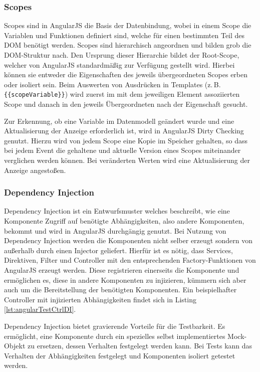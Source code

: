 \subsubsection{Scopes}
\label{sec:scopes}
Scopes sind in AngularJS die Basis der Datenbindung, wobei in einem Scope die Variablen und Funktionen definiert sind, welche für einen bestimmten Teil des DOM benötigt werden. Scopes sind hierarchisch angeordnen und bilden grob die DOM-Struktur nach. Den Ursprung dieser Hierarchie bildet der Root-Scope, welcher von AngularJS standardmäßig zur Verfügung gestellt wird. Hierbei können sie entweder die Eigenschaften des jeweils übergeordneten Scopes erben oder isoliert sein. Beim Auswerten von Ausdrücken in Templates (z.\,B. \texttt{\{\{scopeVariable\}\}}) wird zuerst im mit dem jeweiligen Element assoziierten Scope und danach in den jeweils Übergeordneten nach der Eigenschaft gesucht.\cites[23\psqq]{angular-boehm}[]{angular-scopes}

Zur Erkennung, ob eine Variable im Datenmodell geändert wurde und eine Aktualisierung der Anzeige erforderlich ist, wird in AngularJS Dirty Checking genutzt. Hierzu wird von jedem Scope eine Kopie im Speicher gehalten, so dass bei jedem Event die gehaltene und aktuelle Version eines Scopes miteinander verglichen werden können. Bei veränderten Werten wird eine Aktualisierung der Anzeige angestoßen.\cites[24]{angular-boehm}[]{angular-dirty}

\subsubsection{Dependency Injection}
Dependency Injection ist ein Entwurfsmuster welches beschreibt, wie eine Komponente Zugriff auf benötigte Abhängigkeiten, also andere Komponenten, bekommt und wird in AngularJS durchgängig genutzt. Bei Nutzung von Dependency Injection werden die Komponenten nicht selber erzeugt sondern von außerhalb durch einen Injector geliefert. Hierfür ist es nötig, dass Services, Direktiven, Filter und Controller mit den entsprechenden Factory-Funktionen von AngularJS erzeugt werden. Diese registrieren einerseits die Komponente und ermöglichen es, diese in andere Komponenten zu injizieren, kümmern sich aber auch um die Bereitstellung der benötigten Komponenten. Ein beispielhafter Controller mit injizierten Abhängigkeiten findet sich in Listing \ref{lst:angularTestCtrlDI}.\cite{angular-di}

\begin{figure}
	
\end{figure}

Dependency Injection bietet gravierende Vorteile für die Testbarkeit. Es ermöglicht, eine Komponente durch ein spezielles selbst implementiertes Mock-Objekt zu ersetzen, dessen Verhalten festgelegt werden kann. Bei Tests kann das Verhalten der Abhängigkeiten festgelegt und Komponenten isoliert getestet werden.\cite[][27]{angular-boehm}